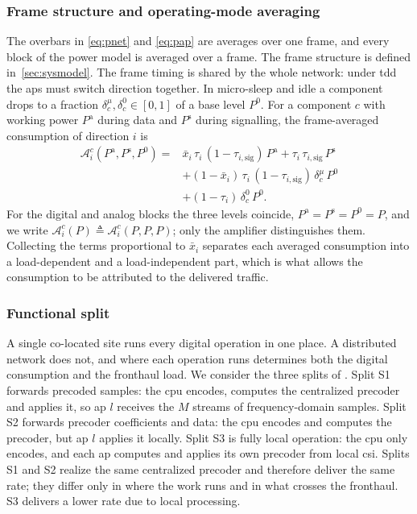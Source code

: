 \subsubsection{Frame structure and operating-mode averaging}
\label{sssec:frame}
The overbars in \eqref{eq:pnet} and \eqref{eq:pap} are averages over one frame,
and every block of the power model is averaged over a frame. The frame structure is defined in~\cref{sec:sysmodel}. The frame
timing is shared by the whole network: under \gls{tdd} the \glspl{ap} must switch
direction together. In micro-sleep and idle a component drops to a fraction
$\delta^{\mu}_{c},\delta^{0}_{c}\in[0,1]$ of a base level $P^{0}$. For a
component $c$ with working power $P^{\mathrm{a}}$ during data and
$P^{\mathrm{s}}$ during signalling, the frame-averaged consumption of direction
$i$ is
\begin{align}
\label{eq:frameavg}
\mathcal{A}_{i}^{c}\!\left(P^{\mathrm a},P^{\mathrm s},P^{0}\right) ={}&
\bar x_{i}\,\tau_i\,(1-\tau_{i,\mathrm{sig}})\,P^{\mathrm a}
+ \tau_i\,\tau_{i,\mathrm{sig}}\,P^{\mathrm s} \nonumber\\
&+ (1-\bar x_{i})\,\tau_i\,(1-\tau_{i,\mathrm{sig}})\,\delta^{\mu}_c\,P^{0}
\nonumber\\
&+ (1-\tau_i)\,\delta^{0}_c\,P^{0} .
\end{align}
For the digital and analog blocks the three levels coincide,
$P^{\mathrm a}=P^{\mathrm s}=P^{0}=P$, and we write
$\mathcal{A}_{i}^{c}(P)\triangleq\mathcal{A}_{i}^{c}(P,P,P)$; only the amplifier
distinguishes them. Collecting the terms proportional to $\bar x_{i}$ separates
each averaged consumption into a load-dependent and a load-independent part,
which is what allows the consumption to be attributed to the delivered traffic.

\subsubsection{Functional split}
\label{sssec:split}
A single co-located site runs every digital operation in one place. A distributed network
does not, and where each operation runs determines both the digital consumption and
the fronthaul load. We consider the three splits of . Split S1
forwards precoded samples: the \gls{cpu} encodes, computes the centralized
precoder and applies it, so \gls{ap} $l$ receives the $M$ streams of
frequency-domain samples. Split S2 forwards precoder coefficients and
data: the \gls{cpu} encodes and computes the precoder, but \gls{ap} $l$ applies
it locally. Split S3 is fully local operation: the \gls{cpu} only encodes, and
each \gls{ap} computes and applies its own precoder from local \gls{csi}. Splits
S1 and S2 realize the same centralized precoder and therefore deliver the same
rate; they differ only in where the work runs and in what crosses the fronthaul.
S3 delivers a lower rate due to local processing.

